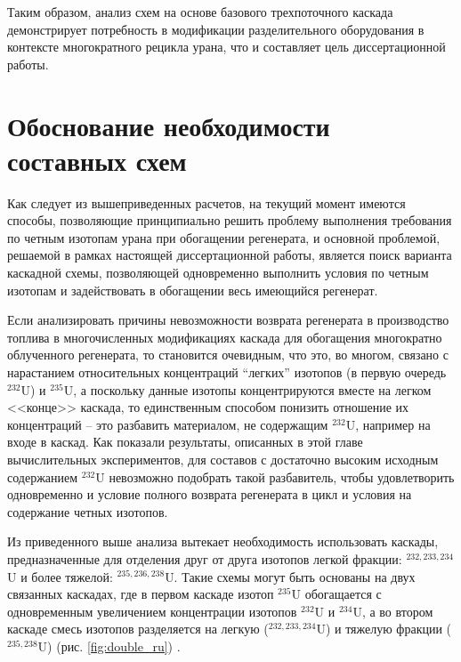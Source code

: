 Таким образом, анализ схем на основе базового трехпоточного каскада демонстрирует потребность в модификации разделительного оборудования в контексте многократного рецикла урана, что и составляет цель диссертационной работы.


\section{Обоснование необходимости составных схем}\label{sec:ch2/sec2}

Как следует из вышеприведенных расчетов, на текущий момент имеются способы, позволяющие принципиально решить проблему выполнения требования по четным изотопам урана при обогащении регенерата, и основной проблемой, решаемой в рамках настоящей диссертационной работы, является поиск варианта каскадной схемы, позволяющей одновременно выполнить условия по четным изотопам и задействовать в обогащении весь имеющийся регенерат.

Если анализировать причины невозможности возврата регенерата в производство топлива в многочисленных модификациях каскада для обогащения многократно облученного регенерата, то становится очевидным, что это, во многом, связано с нарастанием относительных концентраций “легких” изотопов (в первую очередь $^{232}$U) и
$^{235}$U, а поскольку данные изотопы концентрируются вместе на легком <<конце>> каскада, то единственным способом понизить отношение их концентраций -- это разбавить материалом, не содержащим $^{232}$U, например на входе в каскад. Как показали результаты, описанных в этой главе вычислительных экспериментов, для составов с достаточно высоким исходным содержанием $^{232}$U невозможно подобрать такой разбавитель, чтобы удовлетворить одновременно и условие полного возврата регенерата в цикл и условия на содержание четных изотопов.

Из приведенного выше анализа вытекает необходимость использовать каскады, предназначенные для отделения друг от друга изотопов легкой фракции: $^{232,233,234}$U и более тяжелой: $^{235,236,238}$U. Такие схемы могут быть основаны на двух связанных каскадах, где в первом каскаде изотоп $^{235}$U обогащается с одновременным увеличением концентрации изотопов $^{232}$U и $^{234}$U, а во втором каскаде смесь изотопов разделяется на легкую ($^{232,233,234}$U) и тяжелую фракции ($^{235,238}$U) (рис. \ref{fig:double_ru}) \cite{smirnovApplyingEnrichmentCapacities2018}.




